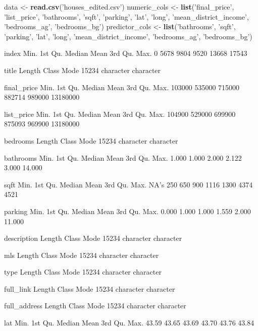 \documentclass[11pt,]{article}
\newenvironment{Shaded}{\begin{snugshade}}{\end{snugshade}}
\newcommand{\KeywordTok}[1]{\textcolor[rgb]{0.13,0.29,0.53}{\textbf{#1}}}
\newcommand{\NormalTok}[1]{#1}
\newcommand{\StringTok}[1]{\textcolor[rgb]{0.31,0.60,0.02}{#1}}
\begin{document}
\begin{Shaded}
\begin{Highlighting}[]
\NormalTok{data <-}\StringTok{ }\KeywordTok{read.csv}\NormalTok{(}\StringTok{'houses_edited.csv'}\NormalTok{)}
\NormalTok{numeric_cols <-}\StringTok{ }\KeywordTok{list}\NormalTok{(}\StringTok{'final_price'}\NormalTok{, }\StringTok{'list_price'}\NormalTok{, }\StringTok{'bathrooms'}\NormalTok{, }\StringTok{'sqft'}\NormalTok{, }\StringTok{'parking'}\NormalTok{, }\StringTok{'lat'}\NormalTok{, }\StringTok{'long'}\NormalTok{, }\StringTok{'mean_district_income'}\NormalTok{, }\StringTok{'bedrooms_ag'}\NormalTok{, }\StringTok{'bedrooms_bg'}\NormalTok{)}
\NormalTok{predictor_cols <-}\StringTok{ }\KeywordTok{list}\NormalTok{(}\StringTok{'bathrooms'}\NormalTok{, }\StringTok{'sqft'}\NormalTok{, }\StringTok{'parking'}\NormalTok{, }\StringTok{'lat'}\NormalTok{, }\StringTok{'long'}\NormalTok{, }\StringTok{'mean_district_income'}\NormalTok{, }\StringTok{'bedrooms_ag'}\NormalTok{, }\StringTok{'bedrooms_bg'}\NormalTok{)}
\end{Highlighting}
\end{Shaded}

index Min. 1st Qu. Median Mean 3rd Qu. Max. 0 5678 9804 9520 13668 17543

title Length Class Mode 15234 character character

final\_price Min. 1st Qu. Median Mean 3rd Qu. Max. 103000 535000 715000
882714 989000 13180000

list\_price Min. 1st Qu. Median Mean 3rd Qu. Max. 104900 529000 699900
875093 969900 13180000

bedrooms Length Class Mode 15234 character character

bathrooms Min. 1st Qu. Median Mean 3rd Qu. Max. 1.000 1.000 2.000 2.122
3.000 14.000

sqft Min. 1st Qu. Median Mean 3rd Qu. Max. NA's 250 650 900 1116 1300
4374 4521

parking Min. 1st Qu. Median Mean 3rd Qu. Max. 0.000 1.000 1.000 1.559
2.000 11.000

description Length Class Mode 15234 character character

mls Length Class Mode 15234 character character

type Length Class Mode 15234 character character

full\_link Length Class Mode 15234 character character

full\_address Length Class Mode 15234 character character

lat Min. 1st Qu. Median Mean 3rd Qu. Max. 43.59 43.65 43.69 43.70 43.76
43.84
\end{document}
